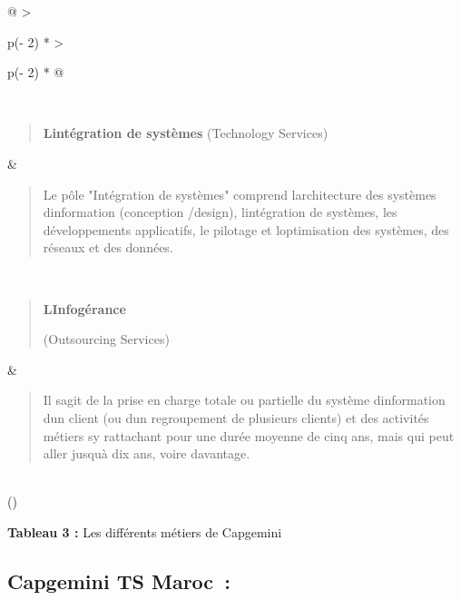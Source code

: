 \documentclass[12pt,a4paper,twoside]{report}
\begin{document}
\begin{longtable}[]{@{}
  >{\raggedright\arraybackslash}p{(\columnwidth - 2\tabcolsep) * }
  >{\raggedright\arraybackslash}p{(\columnwidth - 2\tabcolsep) * }@{}}
\begin{minipage}[t]{\linewidth}
\end{minipage} \\
\begin{minipage}[t]{\linewidth}\raggedright
\begin{quote}
\textbf{L\textquotesingle intégration de systèmes} (Technology
Services)~
\end{quote}
\end{minipage} & \begin{minipage}[t]{\linewidth}\raggedright
\begin{quote}
Le pôle "Intégration de systèmes" comprend
l\textquotesingle architecture des systèmes
d\textquotesingle information (conception /design),
l\textquotesingle intégration de systèmes, les développements
applicatifs, le pilotage et l\textquotesingle optimisation des systèmes,
des réseaux et des données.~
\end{quote}
\end{minipage} \\
\begin{minipage}[t]{\linewidth}\raggedright
\begin{quote}
\textbf{L\textquotesingle Infogérance}~

(Outsourcing Services)~
\end{quote}
\end{minipage} & \begin{minipage}[t]{\linewidth}\raggedright
\begin{quote}
Il s\textquotesingle agit de la prise en charge totale ou partielle du
système d\textquotesingle information d\textquotesingle un client (ou
d\textquotesingle un regroupement de plusieurs clients) et des activités
métiers s\textquotesingle y rattachant pour une durée moyenne de cinq
ans, mais qui peut aller jusqu\textquotesingle à dix ans, voire
davantage.~
\end{quote}
\end{minipage} \\
\bottomrule()
\end{longtable}

\begin{center}
\textbf{Tableau 3 :} Les différents métiers de Capgemini
\end{center}

\hypertarget{capgemini-ts-maroc}{%
\subsection{Capgemini TS Maroc~:}\label{capgemini-ts-maroc}}
\end{document}
